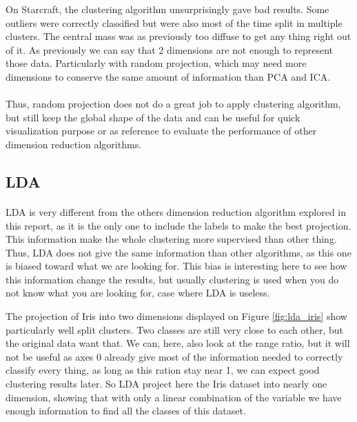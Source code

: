 \documentclass[twocolumn,a4paper,10pt]{article}
\begin{document}
On Starcraft, the clustering algorithm unsurprisingly gave bad results. Some outliers were correctly classified but were also most of the time split in multiple clusters. The central mass was as previously too diffuse to get any thing right out of it. As previously we can say that 2 dimensions are not enough to represent those data. Particularly with random projection, which may need more dimensions to conserve the same amount of information than PCA and ICA.

\paragraph{}
Thus, random projection does not do a great job to apply clustering algorithm, but still keep the global shape of the data and can be useful for quick visualization purpose or as reference to evaluate the performance of other dimension reduction algorithms.

\subsection{LDA}
\paragraph{}

LDA is very different from the others dimension reduction algorithm explored in this report, as it is the only one to include the labels to make the best projection. This information make the whole clustering more supervised than other thing. Thus, LDA does not give the same information than other algorithms, as this one is biased toward what we are looking for. This bias is interesting here to see how this information change the results, but usually clustering is used when you do not know what you are looking for, case where LDA is useless.

The projection of Iris into two dimensions displayed on Figure \ref{fig:lda_iris} show particularly well split clusters. Two classes are still very close to each other, but the original data want that. We can, here, also look at the range ratio, but it will not be useful as axes 0 already give most of the information needed to correctly classify every thing, as long as this ration stay near 1, we can expect good clustering results later. So LDA project here the Iris dataset into nearly one dimension, showing that with only a linear combination of the variable we have enough information to find all the classes of this dataset.
\end{document}
